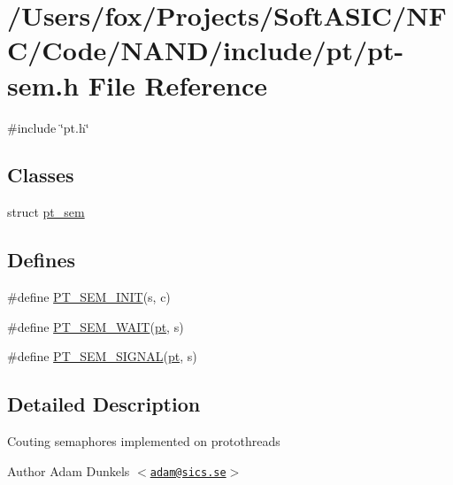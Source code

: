 \hypertarget{pt-sem_8h}{
\section{/Users/fox/Projects/SoftASIC/NFC/Code/NAND/include/pt/pt-\/sem.h File Reference}
\label{pt-sem_8h}
}
{\ttfamily \#include \char`\"{}pt.h\char`\"{}}\par
\subsection*{Classes}
\begin{DoxyCompactItemize}
\item 
struct \hyperlink{structpt__sem}{pt\_\-sem}
\end{DoxyCompactItemize}
\subsection*{Defines}
\begin{DoxyCompactItemize}
\item 
\#define \hyperlink{group__ptsem_gad7089c5dc86f12019f0361d82a75b04b}{PT\_\-SEM\_\-INIT}(s, c)
\item 
\#define \hyperlink{group__ptsem_ga386ff87a52a840512906f2940e229e2e}{PT\_\-SEM\_\-WAIT}(\hyperlink{structpt}{pt}, s)
\item 
\#define \hyperlink{group__ptsem_ga1eaaf4d9d75e24582acc6440d7085f19}{PT\_\-SEM\_\-SIGNAL}(\hyperlink{structpt}{pt}, s)
\end{DoxyCompactItemize}


\subsection{Detailed Description}
Couting semaphores implemented on protothreads \begin{DoxyAuthor}{Author}
Adam Dunkels $<$\href{mailto:adam@sics.se}{\tt adam@sics.se}$>$ 
\end{DoxyAuthor}

